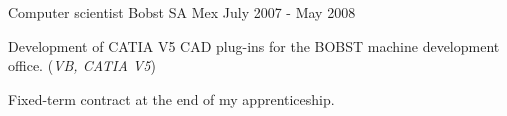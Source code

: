 \begin{cventries}

\cventry
{Computer scientist} %
{Bobst SA} %
{Mex} %
{July 2007 - May 2008} %
{ %
\begin{cvitems}
\item {Development of CATIA V5 CAD plug-ins for the BOBST machine development office. (\emph{VB, CATIA V5})}
\item {Fixed-term contract at the end of my apprenticeship.}
\end{cvitems}
}


\end{cventries}
